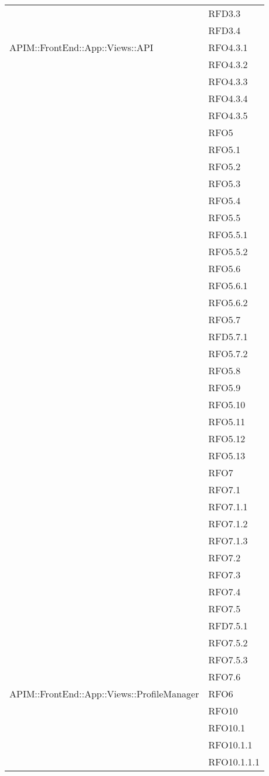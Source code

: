 \begin{longtable}{ p{12cm} | p{4cm} }
			& RFD3.3 \\
			& RFD3.4 \\
			\hline
			APIM::FrontEnd::App::Views::API
			& RFO4.3.1 \\
			& RFO4.3.2 \\
			& RFO4.3.3 \\
			& RFO4.3.4 \\
			& RFO4.3.5 \\
			& RFO5 \\
			& RFO5.1 \\
			& RFO5.2 \\
			& RFO5.3 \\
			& RFO5.4 \\
			& RFO5.5 \\
			& RFO5.5.1 \\
			& RFO5.5.2 \\
			& RFO5.6 \\
			& RFO5.6.1 \\
			& RFO5.6.2 \\
			& RFO5.7 \\
			& RFD5.7.1 \\
			& RFO5.7.2 \\
			& RFO5.8 \\
			& RFO5.9 \\
			& RFO5.10 \\
			& RFO5.11 \\
			& RFO5.12 \\
			& RFO5.13 \\
			& RFO7 \\
			& RFO7.1 \\
			& RFO7.1.1 \\
			& RFO7.1.2 \\
			& RFO7.1.3 \\
			& RFO7.2 \\
			& RFO7.3 \\
			& RFO7.4 \\
			& RFO7.5 \\
			& RFD7.5.1 \\
			& RFO7.5.2 \\
			& RFO7.5.3 \\
			& RFO7.6 \\
			\hline
			APIM::FrontEnd::App::Views::ProfileManager
			& RFO6 \\
			& RFO10 \\
			& RFO10.1 \\
			& RFO10.1.1 \\
			& RFO10.1.1.1 \\

\end{longtable}
